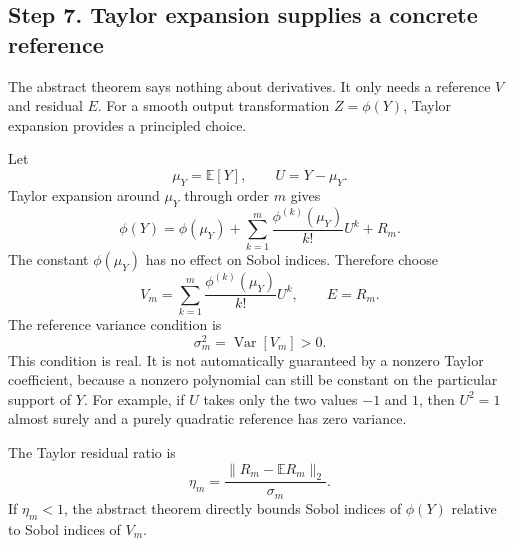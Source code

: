 \documentclass[11pt,letterpaper]{article}
\DeclareMathOperator{\Var}{Var}
\newcommand{\E}{\mathbb{E}}
\theoremstyle{remark}
\begin{document}
\subsection*{Step 7. Taylor expansion supplies a concrete reference}

The abstract theorem says nothing about derivatives. It only needs a reference
$V$ and residual $E$. For a smooth output transformation $Z=\phi(Y)$, Taylor
expansion provides a principled choice.

Let
\begin{equation}
  \mu_Y=\E[Y],
  \qquad
  U=Y-\mu_Y.
\end{equation}
Taylor expansion around $\mu_Y$ through order $m$ gives
\begin{equation}
  \phi(Y)=\phi(\mu_Y)+
  \sum_{k=1}^m\frac{\phi^{(k)}(\mu_Y)}{k!}U^k+R_m.
\end{equation}
The constant $\phi(\mu_Y)$ has no effect on Sobol indices. Therefore choose
\begin{equation}
  V_m=\sum_{k=1}^m\frac{\phi^{(k)}(\mu_Y)}{k!}U^k,
  \qquad
  E=R_m.
\end{equation}
The reference variance condition is
\begin{equation}
  \sigma_m^2=\Var[V_m]>0.
\end{equation}
This condition is real. It is not automatically guaranteed by a nonzero Taylor
coefficient, because a nonzero polynomial can still be constant on the particular
support of $Y$. For example, if $U$ takes only the two values $-1$ and $1$, then
$U^2=1$ almost surely and a purely quadratic reference has zero variance.

The Taylor residual ratio is
\begin{equation}
  \eta_m=\frac{\|R_m-\E R_m\|_2}{\sigma_m}.
\end{equation}
If $\eta_m<1$, the abstract theorem directly bounds Sobol indices of $\phi(Y)$
relative to Sobol indices of $V_m$.
\end{document}
